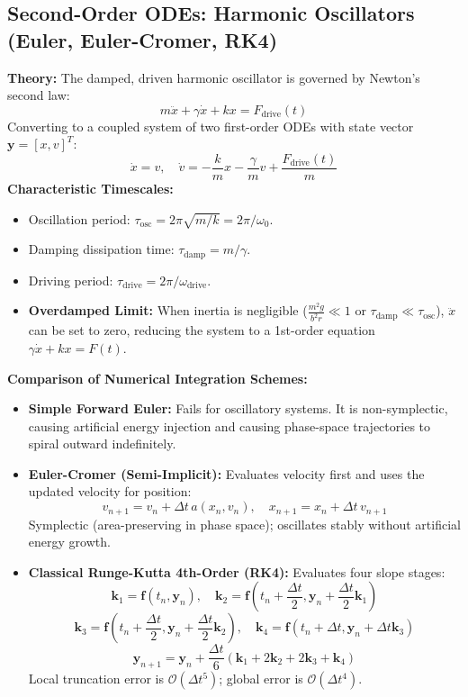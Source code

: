 \documentclass{article}
\begin{document}
\subsection{Second-Order ODEs: Harmonic Oscillators (Euler, Euler-Cromer, RK4)}
\textbf{Theory:} The damped, driven harmonic oscillator is governed by Newton's second law:
$$m \ddot{x} + \gamma \dot{x} + kx = F_{\text{drive}}(t)$$
Converting to a coupled system of two first-order ODEs with state vector $\mathbf{y} = [x, v]^T$:
$$\dot{x} = v, \quad \dot{v} = -\frac{k}{m} x - \frac{\gamma}{m} v + \frac{F_{\text{drive}}(t)}{m}$$
\textbf{Characteristic Timescales:}
\begin{itemize}
    \item Oscillation period: $\tau_{\text{osc}} = 2\pi \sqrt{m/k} = 2\pi / \omega_0$.
    \item Damping dissipation time: $\tau_{\text{damp}} = m / \gamma$.
    \item Driving period: $\tau_{\text{drive}} = 2\pi / \omega_{\text{drive}}$.
    \item \textbf{Overdamped Limit:} When inertia is negligible ($\frac{m^2 g}{b^2 r} \ll 1$ or $\tau_{\text{damp}} \ll \tau_{\text{osc}}$), $\ddot{x}$ can be set to zero, reducing the system to a 1st-order equation $\gamma \dot{x} + kx = F(t)$.
\end{itemize}

\textbf{Comparison of Numerical Integration Schemes:}
\begin{itemize}
    \item \textbf{Simple Forward Euler:} Fails for oscillatory systems. It is non-symplectic, causing artificial energy injection and causing phase-space trajectories to spiral outward indefinitely.
    \item \textbf{Euler-Cromer (Semi-Implicit):} Evaluates velocity first and uses the updated velocity for position:
    $$v_{n+1} = v_n + \Delta t \, a(x_n, v_n), \quad x_{n+1} = x_n + \Delta t \, v_{n+1}$$
    Symplectic (area-preserving in phase space); oscillates stably without artificial energy growth.
    \item \textbf{Classical Runge-Kutta 4th-Order (RK4):} Evaluates four slope stages:
    $$\mathbf{k}_1 = \mathbf{f}(t_n, \mathbf{y}_n), \quad \mathbf{k}_2 = \mathbf{f}\left(t_n + \frac{\Delta t}{2}, \mathbf{y}_n + \frac{\Delta t}{2}\mathbf{k}_1\right)$$
    $$\mathbf{k}_3 = \mathbf{f}\left(t_n + \frac{\Delta t}{2}, \mathbf{y}_n + \frac{\Delta t}{2}\mathbf{k}_2\right), \quad \mathbf{k}_4 = \mathbf{f}(t_n + \Delta t, \mathbf{y}_n + \Delta t \mathbf{k}_3)$$
    $$\mathbf{y}_{n+1} = \mathbf{y}_n + \frac{\Delta t}{6}(\mathbf{k}_1 + 2\mathbf{k}_2 + 2\mathbf{k}_3 + \mathbf{k}_4)$$
    Local truncation error is $\mathcal{O}(\Delta t^5)$; global error is $\mathcal{O}(\Delta t^4)$.
\end{itemize}
\end{document}
